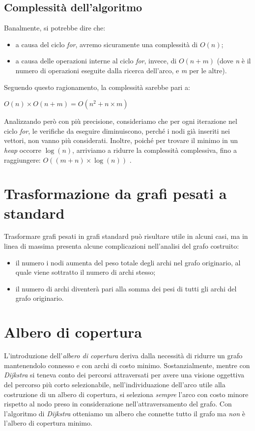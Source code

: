 \subsection{Complessità dell'algoritmo}
Banalmente, si potrebbe dire che:
\begin{itemize}
    \item a causa del ciclo \textit{for}, avremo sicuramente una complessità di $O(n)$;
    \item a causa delle operazioni interne al ciclo \textit{for}, invece, di $O(n+m)$ (dove \textit{n} è il numero di operazioni eseguite dalla ricerca dell'arco, e \textit{m} per le altre).
\end{itemize}
Seguendo questo ragionamento, la complessità sarebbe pari a:
\begin{center}
    $ O(n)\times O(n+m) = O(n^2 + n\times m) $
\end{center}
Analizzando però con più precisione, consideriamo che per ogni iterazione nel ciclo \textit{for}, le verifiche da eseguire diminuiscono, perché i nodi già inseriti nei vettori, non vanno più considerati. Inoltre, poiché per trovare il minimo in un \textit{heap} occorre $\log(n)$, arriviamo a ridurre la complessità complessiva, fino a raggiungere: $O((m+n)\times \log(n))$ .

\section{Trasformazione da grafi pesati a standard}
Trasformare grafi pesati in grafi standard può risultare utile in alcuni casi, ma in linea di massima presenta alcune complicazioni nell'analisi del grafo costruito:
\begin{itemize}
    \item il numero i nodi aumenta del peso totale degli archi nel grafo originario, al quale viene sottratto il numero di archi stesso;
    \item il numero di archi diventerà pari alla somma dei pesi di tutti gli archi del grafo originario.
\end{itemize}

\section{Albero di copertura}
L'introduzione dell'\textit{albero di copertura} deriva dalla necessità di ridurre un grafo mantenendolo connesso e con archi di costo minimo. Sostanzialmente, mentre con \textit{Dijkstra} si teneva conto dei percorsi attraversati per avere una visione oggettiva del percorso più corto selezionabile, nell'individuazione dell'arco utile alla costruzione di un albero di copertura, si seleziona \textit{sempre} l'arco con costo minore rispetto al nodo preso in considerazione nell'attraversamento del grafo.
Con l'algoritmo di \textit{Dijkstra} otteniamo un albero che connette tutto il grafo ma \textit{non} è l'albero di copertura minimo. \\

